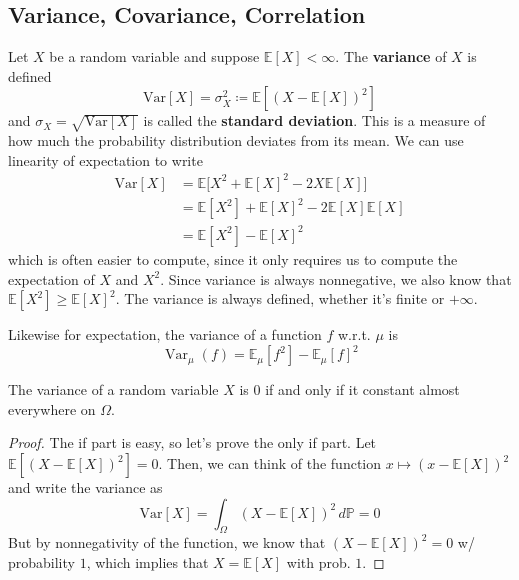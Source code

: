 \documentclass{article}
\DeclareMathOperator{\Var}{Var}
\begin{document}
  \subsection{Variance, Covariance, Correlation}

    \begin{definition}[Variance]
      Let $X$ be a random variable and suppose $\mathbb{E}[X] < \infty$. The \textbf{variance} of $X$ is defined 
      \begin{equation}
        \mathrm{Var}[X] = \sigma^2_X \coloneqq \mathbb{E} [ (X - \mathbb{E}[X])^2 ]
      \end{equation}
      and $\sigma_X = \sqrt{\mathrm{Var}[X]}$ is called the \textbf{standard deviation}. This is a measure of how much the probability distribution deviates from its mean. We can use linearity of expectation to write 
      \begin{align*}
        \mathrm{Var}[X] & = \mathbb{E} \big[ X^2 + \mathbb{E}[X]^2 - 2 X \mathbb{E}[X] \big] \\
        & = \mathbb{E}[X^2] + \mathbb{E}[X]^2 - 2 \mathbb{E}[X] \mathbb{E}[X] \\
        & = \mathbb{E}[X^2] - \mathbb{E}[X]^2
      \end{align*}
      which is often easier to compute, since it only requires us to compute the expectation of $X$ and $X^2$. Since variance is always nonnegative, we also know that $\mathbb{E}[X^2] \geq \mathbb{E}[X]^2$. The variance is always defined, whether it's finite or $+\infty$. 
    \end{definition}

    Likewise for expectation, the variance of a function $f$ w.r.t. $\mu$ is 
    \begin{equation}
      \Var_\mu (f) = \mathbb{E}_\mu [f^2] - \mathbb{E}_\mu [f]^2
    \end{equation}

    \begin{proposition}
      The variance of a random variable $X$ is $0$ if and only if it constant almost everywhere on $\Omega$. 
    \end{proposition}
    \begin{proof}
      The if part is easy, so let's prove the only if part. Let $\mathbb{E} [ (X - \mathbb{E}[X])^2 ] = 0$. Then, we can think of the function $x \mapsto (x - \mathbb{E}[X])^2$ and write the variance as 
      \begin{equation}
        \mathrm{Var}[X] = \int_\Omega (X - \mathbb{E}[X])^2 \, d\mathbb{P} = 0
      \end{equation}
      But by nonnegativity of the function, we know that $(X - \mathbb{E}[X])^2 = 0$ w/ probability $1$, which implies that $X = \mathbb{E}[X]$ with prob. $1$. 
    \end{proof}
\end{document}

